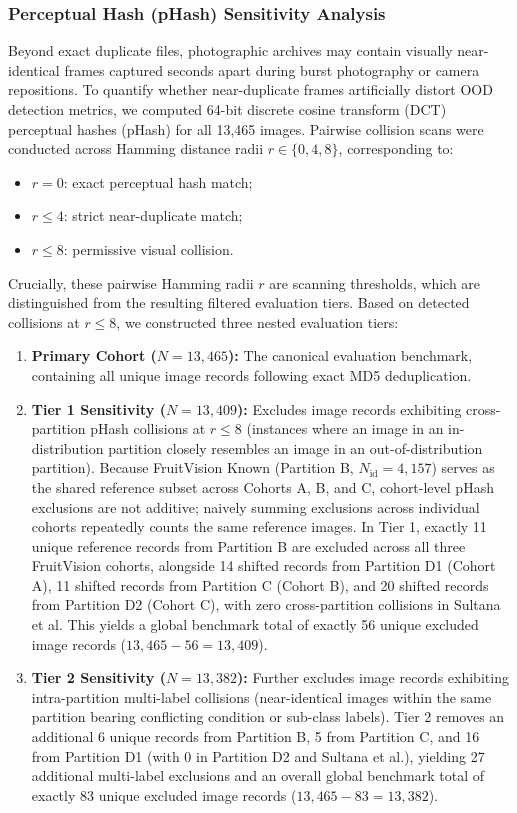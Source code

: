 \subsubsection{Perceptual Hash (pHash) Sensitivity Analysis}
Beyond exact duplicate files, photographic archives may contain visually near-identical frames captured seconds apart during burst photography or camera repositions. To quantify whether near-duplicate frames artificially distort OOD detection metrics, we computed 64-bit discrete cosine transform (DCT) perceptual hashes (pHash) for all 13,465 images. Pairwise collision scans were conducted across Hamming distance radii $r \in \{0, 4, 8\}$, corresponding to:
\begin{itemize}
\item $r = 0$: exact perceptual hash match;
\item $r \le 4$: strict near-duplicate match;
\item $r \le 8$: permissive visual collision.
\end{itemize}
Crucially, these pairwise Hamming radii $r$ are scanning thresholds, which are distinguished from the resulting filtered evaluation tiers. Based on detected collisions at $r \le 8$, we constructed three nested evaluation tiers:
\begin{enumerate}
\item \textbf{Primary Cohort ($N = 13,465$):} The canonical evaluation benchmark, containing all unique image records following exact MD5 deduplication.
\item \textbf{Tier 1 Sensitivity ($N = 13,409$):} Excludes image records exhibiting cross-partition pHash collisions at $r \le 8$ (instances where an image in an in-distribution partition closely resembles an image in an out-of-distribution partition). Because FruitVision Known (Partition B, $N_{\text{id}} = 4,157$) serves as the shared reference subset across Cohorts A, B, and C, cohort-level pHash exclusions are not additive; naively summing exclusions across individual cohorts repeatedly counts the same reference images. In Tier 1, exactly 11 unique reference records from Partition B are excluded across all three FruitVision cohorts, alongside 14 shifted records from Partition D1 (Cohort A), 11 shifted records from Partition C (Cohort B), and 20 shifted records from Partition D2 (Cohort C), with zero cross-partition collisions in Sultana et al. This yields a global benchmark total of exactly 56 unique excluded image records ($13,465 - 56 = 13,409$).
\item \textbf{Tier 2 Sensitivity ($N = 13,382$):} Further excludes image records exhibiting intra-partition multi-label collisions (near-identical images within the same partition bearing conflicting condition or sub-class labels). Tier 2 removes an additional 6 unique records from Partition B, 5 from Partition C, and 16 from Partition D1 (with 0 in Partition D2 and Sultana et al.), yielding 27 additional multi-label exclusions and an overall global benchmark total of exactly 83 unique excluded image records ($13,465 - 83 = 13,382$).
\end{enumerate}

